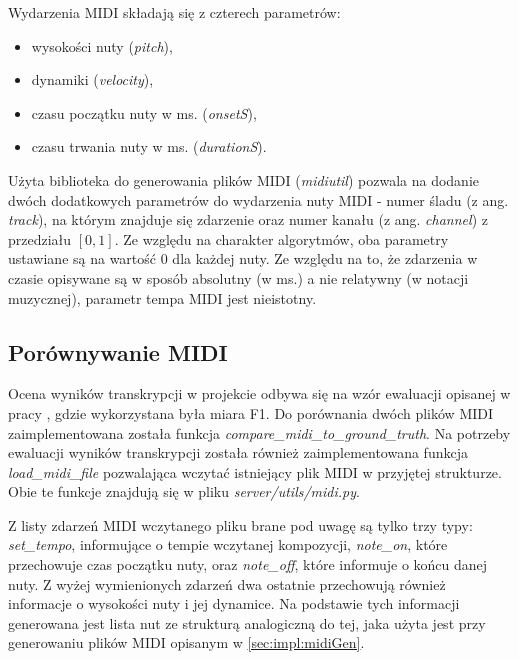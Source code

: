\documentclass[12pt,a4paper,twoside]{mwart}
\begin{document}
Wydarzenia MIDI składają się z czterech parametrów:
\begin{itemize}
  \item wysokości nuty (\textit{pitch}),
  \item dynamiki (\textit{velocity}),
  \item czasu początku nuty w ms. (\textit{onsetS}),
  \item czasu trwania nuty w ms. (\textit{durationS}).
\end{itemize}
Użyta biblioteka do generowania plików MIDI (\textit{midiutil}) pozwala na dodanie dwóch dodatkowych parametrów do wydarzenia nuty MIDI - numer śladu (z ang. \textit{track}), na którym znajduje się zdarzenie oraz numer kanału (z ang. \textit{channel}) z przedziału $\left[0, 1\right]$. Ze względu na charakter algorytmów, oba parametry ustawiane są na wartość $0$ dla każdej nuty. Ze względu na to, że zdarzenia w czasie opisywane są w sposób absolutny (w ms.) a nie relatywny (w notacji muzycznej), parametr tempa MIDI jest nieistotny.

\subsection{Porównywanie MIDI}\label{sec:impl:midiCompare}
Ocena wyników transkrypcji w projekcie odbywa się na wzór ewaluacji opisanej w pracy \cite[3]{Transcription:Pertus:Inharmonicity}, gdzie wykorzystana była miara F1. Do porównania dwóch plików MIDI zaimplementowana została funkcja \textit{compare\_midi\_to\_ground\_truth}. Na potrzeby ewaluacji wyników transkrypcji została również zaimplementowana funkcja \textit{load\_midi\_file} pozwalająca wczytać istniejący plik MIDI w przyjętej strukturze. Obie te funkcje znajdują się w pliku \textit{server/utils/midi.py}.

Z listy zdarzeń MIDI wczytanego pliku brane pod uwagę są tylko trzy typy: \textit{set\_tempo}, informujące o tempie wczytanej kompozycji, \textit{note\_on}, które przechowuje czas początku nuty, oraz \textit{note\_off}, które informuje o końcu danej nuty. Z wyżej wymienionych zdarzeń dwa ostatnie przechowują również informacje o wysokości nuty i jej dynamice. Na podstawie tych informacji generowana jest lista nut ze strukturą analogiczną do tej, jaka użyta jest przy generowaniu plików MIDI opisanym w \ref{sec:impl:midiGen}.
\end{document}

